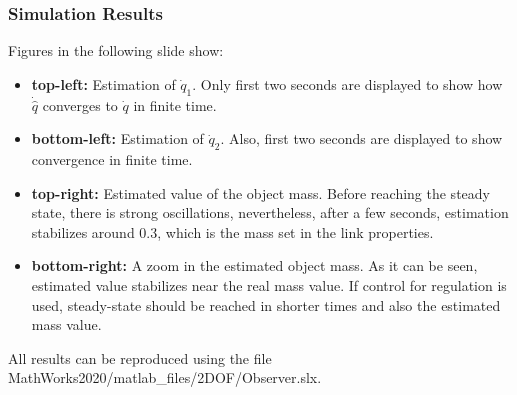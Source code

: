 \documentclass[9pt,spanish,aspectratio=1610]{beamer}
\begin{document}
\begin{frame}\frametitle{Simulation Results}
  Figures in the following slide show:
  \begin{itemize}
  \item \textbf{top-left:} Estimation of $\dot{q}_1$. Only first two seconds are displayed to show how $\dot{\hat{q}}$ converges to $\dot{q}$ in finite time.
  \item \textbf{bottom-left:} Estimation of $\dot{q}_2$. Also, first two seconds are displayed to show convergence in finite time.
  \item \textbf{top-right:} Estimated value of the object mass. Before reaching the steady state, there is strong oscillations, nevertheless, after a few seconds, estimation stabilizes around 0.3, which is the mass set in the link properties.
  \item \textbf{bottom-right:} A zoom in the estimated object mass. As it can be seen, estimated value stabilizes near the real mass value. If control for regulation is used, steady-state should be reached in shorter times and also the estimated mass value.
  \end{itemize}

  All results can be reproduced using the file MathWorks2020/matlab\_files/2DOF/Observer.slx.
\end{frame}
\end{document}
